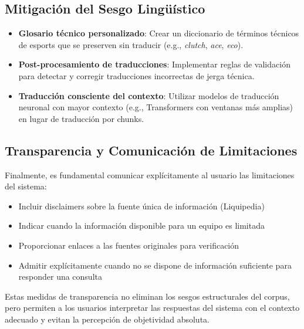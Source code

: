 \subsection{Mitigación del Sesgo Lingüístico}

\begin{itemize}
    \item \textbf{Glosario técnico personalizado}: Crear un diccionario de términos técnicos de esports que se preserven sin traducir (e.g., \textit{clutch}, \textit{ace}, \textit{eco}).
    \item \textbf{Post-procesamiento de traducciones}: Implementar reglas de validación para detectar y corregir traducciones incorrectas de jerga técnica.
    \item \textbf{Traducción consciente del contexto}: Utilizar modelos de traducción neuronal con mayor contexto (e.g., Transformers con ventanas más amplias) en lugar de traducción por chunks.
\end{itemize}

\subsection{Transparencia y Comunicación de Limitaciones}

Finalmente, es fundamental comunicar explícitamente al usuario las limitaciones del sistema:

\begin{itemize}
    \item Incluir disclaimers sobre la fuente única de información (Liquipedia)
    \item Indicar cuando la información disponible para un equipo es limitada
    \item Proporcionar enlaces a las fuentes originales para verificación
    \item Admitir explícitamente cuando no se dispone de información suficiente para responder una consulta
\end{itemize}

Estas medidas de transparencia no eliminan los sesgos estructurales del corpus, pero permiten a los usuarios interpretar las respuestas del sistema con el contexto adecuado y evitan la percepción de objetividad absoluta.

